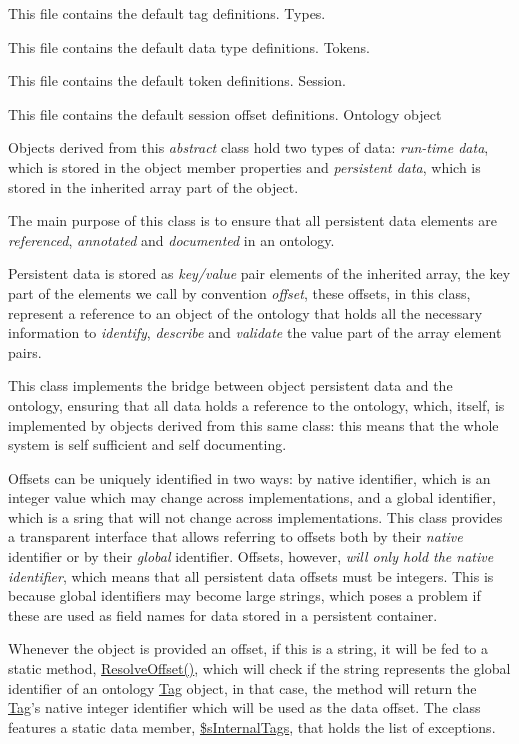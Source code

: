 This file contains the default tag definitions. Types.

This file contains the default data type definitions. Tokens.

This file contains the default token definitions. Session.

This file contains the default session offset definitions. Ontology object

Objects derived from this {\itshape abstract} class hold two types of data\-: {\itshape run-\/time data}, which is stored in the object member properties and {\itshape persistent data}, which is stored in the inherited array part of the object.

The main purpose of this class is to ensure that all persistent data elements are {\itshape referenced}, {\itshape annotated} and {\itshape documented} in an ontology.

Persistent data is stored as {\itshape key/value} pair elements of the inherited array, the key part of the elements we call by convention {\itshape offset}, these offsets, in this class, represent a reference to an object of the ontology that holds all the necessary information to {\itshape identify}, {\itshape describe} and {\itshape validate} the value part of the array element pairs.

This class implements the bridge between object persistent data and the ontology, ensuring that all data holds a reference to the ontology, which, itself, is implemented by objects derived from this same class\-: this means that the whole system is self sufficient and self documenting.

Offsets can be uniquely identified in two ways\-: by native identifier, which is an integer value which may change across implementations, and a global identifier, which is a sring that will not change across implementations. This class provides a transparent interface that allows referring to offsets both by their {\itshape native} identifier or by their {\itshape global} identifier. Offsets, however, {\itshape will only hold the native identifier}, which means that all persistent data offsets must be integers. This is because global identifiers may become large strings, which poses a problem if these are used as field names for data stored in a persistent container.

Whenever the object is provided an offset, if this is a string, it will be fed to a static method, \hyperlink{class_ontology_wrapper_1_1_ontology_object_a12e1e673943d68230be1807bf6bd63cb}{Resolve\-Offset()}, which will check if the string represents the global identifier of an ontology \hyperlink{class_ontology_wrapper_1_1_tag}{Tag} object, in that case, the method will return the \hyperlink{class_ontology_wrapper_1_1_tag}{Tag}'s native integer identifier which will be used as the data offset. The class features a static data member, \hyperlink{}{\$s\-Internal\-Tags}, that holds the list of exceptions.

